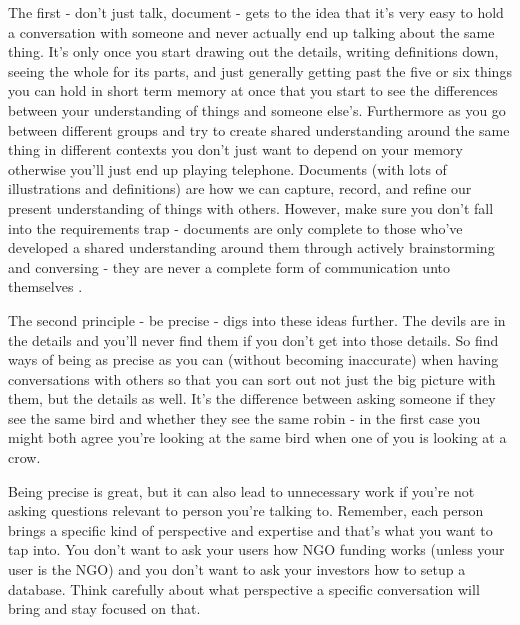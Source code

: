 \documentclass[11pt]{book}
\begin{document}
The first - don't just talk, document - gets to the idea that it's very easy to hold a conversation with someone and never actually end up talking about the same thing. It's only once you start drawing out the details, writing definitions down, seeing the whole for its parts, and just generally getting past the five or six things you can hold in short term memory at once \cite{ericsson} that you start to see the differences between your understanding of things and someone else's. Furthermore as you go between different groups and try to create shared understanding around the same thing in different contexts you don't just want to depend on your memory otherwise you'll just end up playing telephone. Documents (with lots of illustrations and definitions) are how we can capture, record, and refine our present understanding of things with others. However, make sure you don't fall into the requirements trap - documents are only complete to those who've developed a shared understanding around them through actively brainstorming and conversing - they are never a complete form of communication unto themselves \cite{patton}.
\newline

The second principle - be precise - digs into these ideas further. The devils are in the details and you'll never find them if you don't get into those details. So find ways of being as precise as you can (without becoming inaccurate) when having conversations with others so that you can sort out not just the big picture with them, but the details as well. It's the difference between asking someone if they see the same bird and whether they see the same robin - in the first case you might both agree you're looking at the same bird when one of you is looking at a crow. 
\newline

Being precise is great, but it can also lead to unnecessary work if you're not asking questions relevant to person you're talking to. Remember, each person brings a specific kind of perspective and expertise and that's what you want to tap into. You don't want to ask your users how NGO funding works (unless your user is the NGO) and you don't want to ask your investors how to setup a database. Think carefully about what perspective a specific conversation will bring and stay focused on that.
\newline
\end{document}
